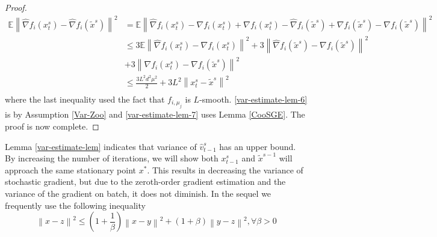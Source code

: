 \documentclass{article}
\newcommand*{\E}{\mathbb{E}}
\newcommand{\norm}[1]{\left\lVert#1\right\rVert}
\theoremstyle{definition}
\theoremstyle{remark}
\begin{document}
\begin{proof}
  \begin{equation}
 \begin{split}
 \E \norm{\hat{\nabla} f_i(x_{t}^s)-\hat{\nabla} f_i(\tilde{x}^s)}^2 &= \E \norm{ \hat{\nabla} f_i(x_{t}^s)-{\nabla} f_i(x_{t}^s) + {\nabla} f_i(x_{t}^s)-\hat{\nabla} f_i(\tilde{x}^s)+{\nabla} f_i(\tilde{x}^s)-{\nabla} f_i(\tilde{x}^s)}^2\\
 &\leq 3 \E \norm{ \hat{\nabla} f_i(x_{t}^s)-{\nabla} f_i(x_{t}^s)}^2 + 3\norm{\hat{\nabla} f_i(\tilde{x}^s) - {\nabla} f_i(\tilde{x}^s)}^2\\
 &+ 3\norm{{\nabla} f_i(x_{t}^s) - {\nabla} f_i(\tilde{x}^s)}^2\\
 &\leq \frac{3 L^2 d^2 \mu^2}{2} + 3L^2 \norm{x_{t}^s-\tilde{x}^s}^2\\
 \end{split}
 \end{equation}
  where the last inequality used the fact that $f_{i,\mu_j}$ is $L$-smooth. \eqref{var-estimate-lem-6} is by Assumption \ref{Var-Zoo} and \eqref{var-estimate-lem-7} uses Lemma \ref{CooSGE}. The proof is now complete.
\end{proof}
Lemma \ref{var-estimate-lem} indicates that variance of $\hat{v}_{t-1}^s$ has an upper bound. By increasing the number of iterations, we will show both $x_{t-1}^s$ and $\tilde{x}^{s-1}$ will approach the same stationary point $x^*$.  This results in decreasing the variance of stochastic gradient, but due to the zeroth-order gradient estimation and the variance of the gradient on batch, it does not diminish.
In the sequel we frequently use the following inequality
\begin{equation}\label{young}
\norm{x-z}^2 \leq (1+\frac{1}{\beta})\norm{x-y}^2 + (1+\beta) \norm{{y-z}}^2, \forall \beta> 0
\end{equation}
\end{document}
